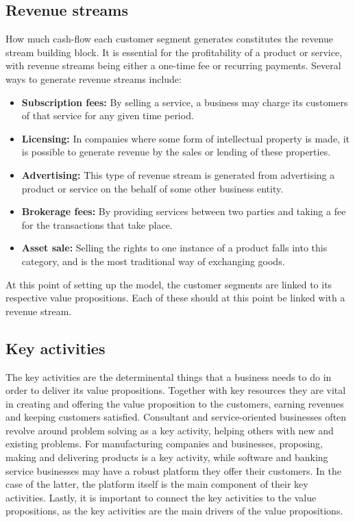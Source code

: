 \subsection{Revenue streams}
How much cash-flow each customer segment generates constitutes the revenue stream building block. It is essential for the profitability of a product or service, with revenue streams being either a one-time fee or recurring payments. Several ways to generate revenue streams include:

\begin{itemize}
    \item \textbf{Subscription fees: }By selling a service, a business may charge its customers of that service for any given time period. 
    \item \textbf{Licensing: }In companies where some form of intellectual property is made, it is possible to generate revenue by the sales or lending of these properties.
    \item \textbf{Advertising: }This type of revenue stream is generated from advertising a product or service on the behalf of some other business entity.
    \item \textbf{Brokerage fees: }By providing services between two parties and taking a fee for the transactions that take place.
    \item \textbf{Asset sale: }Selling the rights to one instance of a product falls into this category, and is the most traditional way of exchanging goods.
\end{itemize}

At this point of setting up the model, the customer segments are linked to its respective value propositions. Each of these should at this point be linked with a revenue stream.

\subsection{Key activities}
The key activities are the determinental things that a business needs to do in order to deliver its value propositions. Together with key resources they are vital in creating and offering the value proposition to the customers, earning revenues and keeping customers satisfied. Consultant and service-oriented businesses often revolve around problem solving as a key activity, helping others with new and existing problems. For manufacturing companies and businesses, proposing, making and delivering products is a key activity, while software and banking service businesses may have a robust platform they offer their customers. In the case of the latter, the platform itself is the main component of their key activities. Lastly, it is important to connect the key activities to the value propositions, as the key activities are the main drivers of the value propositions.

